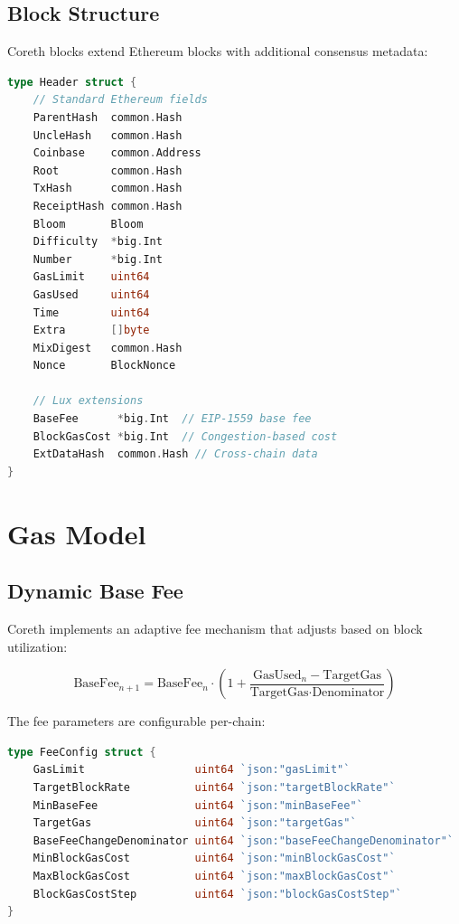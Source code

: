 \documentclass[11pt,letterpaper]{article}
\begin{document}
\subsection{Block Structure}

Coreth blocks extend Ethereum blocks with additional consensus metadata:

\begin{lstlisting}[language=Go, caption=Extended Block Header]
type Header struct {
    // Standard Ethereum fields
    ParentHash  common.Hash
    UncleHash   common.Hash
    Coinbase    common.Address
    Root        common.Hash
    TxHash      common.Hash
    ReceiptHash common.Hash
    Bloom       Bloom
    Difficulty  *big.Int
    Number      *big.Int
    GasLimit    uint64
    GasUsed     uint64
    Time        uint64
    Extra       []byte
    MixDigest   common.Hash
    Nonce       BlockNonce

    // Lux extensions
    BaseFee      *big.Int  // EIP-1559 base fee
    BlockGasCost *big.Int  // Congestion-based cost
    ExtDataHash  common.Hash // Cross-chain data
}
\end{lstlisting}

\section{Gas Model}

\subsection{Dynamic Base Fee}

Coreth implements an adaptive fee mechanism that adjusts based on block utilization:

\begin{equation}
\text{BaseFee}_{n+1} = \text{BaseFee}_n \cdot \left(1 + \frac{\text{GasUsed}_n - \text{TargetGas}}{\text{TargetGas} \cdot \text{Denominator}}\right)
\end{equation}

The fee parameters are configurable per-chain:

\begin{lstlisting}[language=Go, caption=Fee Configuration]
type FeeConfig struct {
    GasLimit                 uint64 `json:"gasLimit"`
    TargetBlockRate          uint64 `json:"targetBlockRate"`
    MinBaseFee               uint64 `json:"minBaseFee"`
    TargetGas                uint64 `json:"targetGas"`
    BaseFeeChangeDenominator uint64 `json:"baseFeeChangeDenominator"`
    MinBlockGasCost          uint64 `json:"minBlockGasCost"`
    MaxBlockGasCost          uint64 `json:"maxBlockGasCost"`
    BlockGasCostStep         uint64 `json:"blockGasCostStep"`
}
\end{lstlisting}
\end{document}
